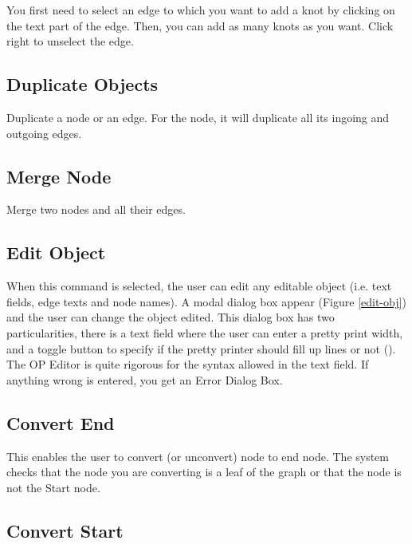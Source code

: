 You first need to select an edge to which you want to add a knot by
clicking on the text part of the edge. Then, you can add as many knots as
you want. Click right to unselect the edge.

\subsection{Duplicate Objects}

Duplicate a node or an edge. For the node, it will duplicate all its ingoing
and outgoing edges.

\subsection{Merge Node}

Merge two nodes and all their edges.

\subsection{Edit Object}


When this command is selected, the user can edit any editable object (i.e.
text fields, edge texts and node names). A modal dialog box appear (Figure
\ref{edit-obj}) and the user can change the object edited. This dialog box
has two particularities, there is a text field where the user can enter a
pretty print width, and a toggle button to specify if the pretty printer
should
fill up lines or not (). The OP Editor is quite
rigorous for the syntax allowed in the text field. If anything wrong
is entered, you get an Error Dialog Box.

\subsection{Convert End}

This enables the user to convert (or unconvert) node to end node. The
system checks that the node you are converting is a leaf of the
graph or that the node is not the Start node.

\subsection{Convert Start}

